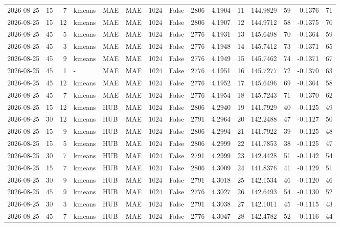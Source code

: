 \documentclass[10pt]{article}
\begin{document}
\begin{landscape}
\begin{longtable}{@{}lrrlllrcrrrrrrr@{}}
2026-08-25 & 15 & 7 & kmeans & MAE & MAE & 1024 & False & 2806 & 4.1904 & 11 & 144.9829 & 59 & -0.1376 & 71 \\
2026-08-25 & 15 & 12 & kmeans & MAE & MAE & 1024 & False & 2806 & 4.1907 & 12 & 144.9712 & 58 & -0.1375 & 70 \\
2026-08-25 & 45 & 5 & kmeans & MAE & MAE & 1024 & False & 2776 & 4.1931 & 13 & 145.6498 & 70 & -0.1364 & 59 \\
2026-08-25 & 45 & 3 & kmeans & MAE & MAE & 1024 & False & 2776 & 4.1948 & 14 & 145.7412 & 73 & -0.1371 & 65 \\
2026-08-25 & 45 & 9 & kmeans & MAE & MAE & 1024 & False & 2776 & 4.1949 & 15 & 145.7462 & 74 & -0.1371 & 67 \\
2026-08-25 & 45 & 1 & - & MAE & MAE & 1024 & False & 2776 & 4.1951 & 16 & 145.7277 & 72 & -0.1370 & 63 \\
2026-08-25 & 45 & 12 & kmeans & MAE & MAE & 1024 & False & 2776 & 4.1952 & 17 & 145.6496 & 69 & -0.1364 & 58 \\
2026-08-25 & 45 & 7 & kmeans & MAE & MAE & 1024 & False & 2776 & 4.1954 & 18 & 145.7243 & 71 & -0.1370 & 62 \\
2026-08-25 & 15 & 12 & kmeans & HUB & MAE & 1024 & False & 2806 & 4.2940 & 19 & 141.7929 & 40 & -0.1125 & 49 \\
2026-08-25 & 30 & 12 & kmeans & HUB & MAE & 1024 & False & 2791 & 4.2964 & 20 & 142.2488 & 47 & -0.1127 & 50 \\
2026-08-25 & 15 & 9 & kmeans & HUB & MAE & 1024 & False & 2806 & 4.2994 & 21 & 141.7922 & 39 & -0.1125 & 48 \\
2026-08-25 & 15 & 5 & kmeans & HUB & MAE & 1024 & False & 2806 & 4.2999 & 22 & 141.7853 & 38 & -0.1125 & 47 \\
2026-08-25 & 30 & 7 & kmeans & HUB & MAE & 1024 & False & 2791 & 4.2999 & 23 & 142.4428 & 51 & -0.1142 & 54 \\
2026-08-25 & 15 & 7 & kmeans & HUB & MAE & 1024 & False & 2806 & 4.3009 & 24 & 141.8376 & 41 & -0.1129 & 51 \\
2026-08-25 & 30 & 9 & kmeans & HUB & MAE & 1024 & False & 2791 & 4.3018 & 25 & 142.1534 & 46 & -0.1120 & 46 \\
2026-08-25 & 45 & 9 & kmeans & HUB & MAE & 1024 & False & 2776 & 4.3027 & 26 & 142.6493 & 54 & -0.1130 & 52 \\
2026-08-25 & 30 & 3 & kmeans & HUB & MAE & 1024 & False & 2791 & 4.3038 & 27 & 142.1011 & 45 & -0.1115 & 43 \\
2026-08-25 & 45 & 7 & kmeans & HUB & MAE & 1024 & False & 2776 & 4.3047 & 28 & 142.4782 & 52 & -0.1116 & 44 \\

\end{longtable}
\end{landscape}
\end{document}
